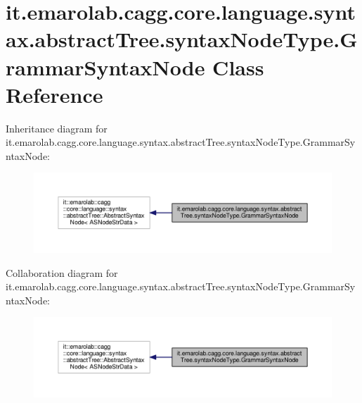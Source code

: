 \hypertarget{classit_1_1emarolab_1_1cagg_1_1core_1_1language_1_1syntax_1_1abstractTree_1_1syntaxNodeType_1_1GrammarSyntaxNode}{\section{it.\-emarolab.\-cagg.\-core.\-language.\-syntax.\-abstract\-Tree.\-syntax\-Node\-Type.\-Grammar\-Syntax\-Node Class Reference}
\label{classit_1_1emarolab_1_1cagg_1_1core_1_1language_1_1syntax_1_1abstractTree_1_1syntaxNodeType_1_1GrammarSyntaxNode}
}


Inheritance diagram for it.\-emarolab.\-cagg.\-core.\-language.\-syntax.\-abstract\-Tree.\-syntax\-Node\-Type.\-Grammar\-Syntax\-Node\-:\nopagebreak
\begin{figure}[H]
\begin{center}
\leavevmode
\includegraphics[width=350pt]{classit_1_1emarolab_1_1cagg_1_1core_1_1language_1_1syntax_1_1abstractTree_1_1syntaxNodeType_1_1Ga89203c3007e70afb529ae479ee5ea83}
\end{center}
\end{figure}


Collaboration diagram for it.\-emarolab.\-cagg.\-core.\-language.\-syntax.\-abstract\-Tree.\-syntax\-Node\-Type.\-Grammar\-Syntax\-Node\-:\nopagebreak
\begin{figure}[H]
\begin{center}
\leavevmode
\includegraphics[width=350pt]{classit_1_1emarolab_1_1cagg_1_1core_1_1language_1_1syntax_1_1abstractTree_1_1syntaxNodeType_1_1GrammarSyntaxNode__coll__graph}
\end{center}
\end{figure}
